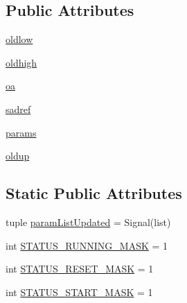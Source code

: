\subsection*{Public Attributes}
\begin{DoxyCompactItemize}
\item 
\hyperlink{classsoftware_1_1chipwhisperer_1_1capture_1_1scopes_1_1cwhardware_1_1ChipWhispererSAD_1_1ChipWhispererSAD_acf4af24f195c2c9c24fe30af37357d6b}{oldlow}
\item 
\hyperlink{classsoftware_1_1chipwhisperer_1_1capture_1_1scopes_1_1cwhardware_1_1ChipWhispererSAD_1_1ChipWhispererSAD_ad1dd4a1e378e8431b34541706f1c52a0}{oldhigh}
\item 
\hyperlink{classsoftware_1_1chipwhisperer_1_1capture_1_1scopes_1_1cwhardware_1_1ChipWhispererSAD_1_1ChipWhispererSAD_a3544050360814da040141bfe7a63a772}{oa}
\item 
\hyperlink{classsoftware_1_1chipwhisperer_1_1capture_1_1scopes_1_1cwhardware_1_1ChipWhispererSAD_1_1ChipWhispererSAD_a7eb7ada127e148e76f41e602a511510e}{sadref}
\item 
\hyperlink{classsoftware_1_1chipwhisperer_1_1capture_1_1scopes_1_1cwhardware_1_1ChipWhispererSAD_1_1ChipWhispererSAD_afdf134d2123831254fd38ff0bd1839c3}{params}
\item 
\hyperlink{classsoftware_1_1chipwhisperer_1_1capture_1_1scopes_1_1cwhardware_1_1ChipWhispererSAD_1_1ChipWhispererSAD_a3f1d36dc8d37e310db4d3b88ae0b7112}{oldup}
\end{DoxyCompactItemize}
\subsection*{Static Public Attributes}
\begin{DoxyCompactItemize}
\item 
tuple \hyperlink{classsoftware_1_1chipwhisperer_1_1capture_1_1scopes_1_1cwhardware_1_1ChipWhispererSAD_1_1ChipWhispererSAD_a7b4cc11986ee05ecd4fe326d5c5c06c3}{param\+List\+Updated} = Signal(list)
\item 
int \hyperlink{classsoftware_1_1chipwhisperer_1_1capture_1_1scopes_1_1cwhardware_1_1ChipWhispererSAD_1_1ChipWhispererSAD_acdcac8a14c9b86f8d83bc6b7f0eab580}{S\+T\+A\+T\+U\+S\+\_\+\+R\+U\+N\+N\+I\+N\+G\+\_\+\+M\+A\+S\+K} = 1
\item 
int \hyperlink{classsoftware_1_1chipwhisperer_1_1capture_1_1scopes_1_1cwhardware_1_1ChipWhispererSAD_1_1ChipWhispererSAD_a2033770def24ebc6fe09dabc9f53890f}{S\+T\+A\+T\+U\+S\+\_\+\+R\+E\+S\+E\+T\+\_\+\+M\+A\+S\+K} = 1
\item 
int \hyperlink{classsoftware_1_1chipwhisperer_1_1capture_1_1scopes_1_1cwhardware_1_1ChipWhispererSAD_1_1ChipWhispererSAD_a541ee5249969a00a210adee5f62e58d5}{S\+T\+A\+T\+U\+S\+\_\+\+S\+T\+A\+R\+T\+\_\+\+M\+A\+S\+K} = 1
\end{DoxyCompactItemize}


